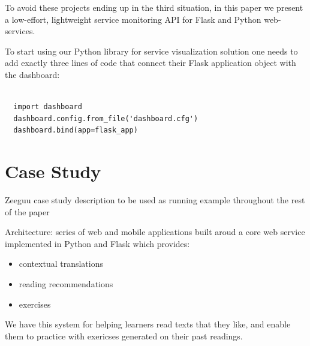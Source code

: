\documentclass[conference]{IEEEtran}
\begin{document}
To avoid these projects ending up in the third situation, in this paper we present a low-effort, lightweight service monitoring API for Flask and Python web-services.

To start using our Python library for service visualization solution one needs to add exactly three lines of code that connect their Flask application object with the dashboard:

\begin{lstlisting}[float,caption=TBA,style=custompython]

  import dashboard
  dashboard.config.from_file('dashboard.cfg')
  dashboard.bind(app=flask_app)

\end{lstlisting}






\section{Case Study}

Zeeguu case study description to be used as running example throughout the rest of the paper \cite{Lungu16}

Architecture: series of web and mobile applications built aroud a core web service implemented in Python and Flask which provides: 
\begin{itemize}
  \item contextual translations 
  \item reading recommendations
  \item exercises
\end{itemize}

We have this system for helping learners read texts that they like, and enable them to practice with exericses generated on their past readings.

\end{document}

